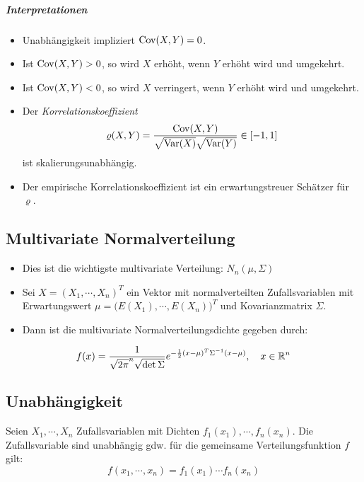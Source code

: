             \subparagraph{Interpretationen}
	            \begin{itemize}
	            	\item Unabhängigkeit impliziert \( \operatorname{Cov}(X, Y) = 0 \).
	            	\item Ist \( \operatorname{Cov}(X, Y) > 0 \), so wird \(X\) erhöht, wenn \(Y\) erhöht wird und umgekehrt.
	            	\item Ist \( \operatorname{Cov}(X, Y) < 0 \), so wird \(X\) verringert, wenn \(Y\) erhöht wird und umgekehrt.
	            	\item Der \textit{Korrelationskoeffizient}
		            	\begin{equation*}
			            	\varrho(X, Y) = \frac{\operatorname{Cov}(X, Y)}{\sqrt{\operatorname{Var}(X)} \sqrt{\operatorname{Var}(Y)}} \in [-1, 1]
		            	\end{equation*}
		            	ist skalierungsunabhängig.
		            \item Der empirische Korrelationskoeffizient ist ein erwartungstreuer Schätzer für \( \varrho \).
	            \end{itemize}

		\subsection{Multivariate Normalverteilung}
			\begin{itemize}
				\item Dies ist die wichtigste multivariate Verteilung: \( N_n(\mu, \Sigma) \)
				\item Sei \( X = (X_1, \cdots, X_n)^T \) ein Vektor mit normalverteilten Zufallsvariablen mit Erwartungswert \( \mu = \big( E(X_1), \cdots, E(X_n) \big)^T \) und Kovarianzmatrix \(\Sigma\).
				\item Dann ist die multivariate Normalverteilungsdichte gegeben durch:
			\end{itemize}
			\begin{equation*}
				f(x) = \frac{1}{\sqrt{2\pi}^n \sqrt{\det \Sigma}} e ^ { -\frac{1}{2} (x - \mu)^T \Sigma^{-1} (x - \mu) }, \quad x \in \mathbb{R}^n
			\end{equation*}

        \subsection{Unabhängigkeit}
            Seien \( X_1, \cdots, X_n \) Zufallsvariablen mit Dichten \( f_1(x_1), \cdots, f_n(x_n) \). Die Zufallsvariable sind unabhängig gdw. für die gemeinsame Verteilungsfunktion \(f\) gilt:
            \begin{equation*}
                f(x_1, \cdots, x_n) = f_1(x_1) \cdots f_n(x_n)
            \end{equation*}

